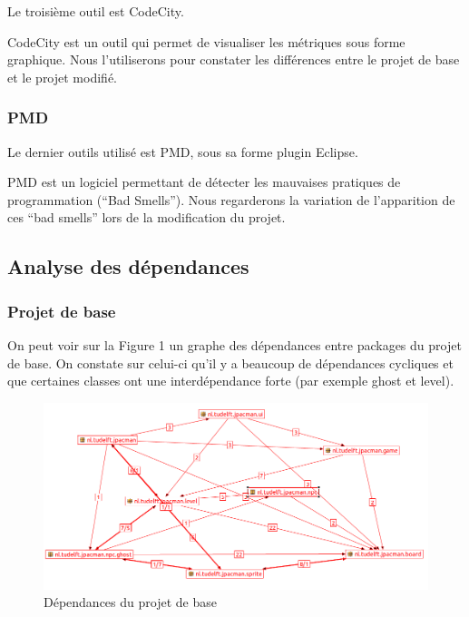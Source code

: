 \documentclass[a4paper,12pt]{report} %
\begin{document}
Le troisième outil est CodeCity.

CodeCity est un outil qui permet de visualiser les métriques sous
forme graphique. Nous l'utiliserons pour constater les différences
entre le projet de base et le projet modifié.


\subsubsection{PMD}

Le dernier outils utilisé est PMD, sous sa forme plugin Eclipse.

PMD est un logiciel permettant de détecter les mauvaises pratiques
de programmation (``Bad Smells''). Nous regarderons la variation
de l'apparition de ces ``bad smells'' lors de la modification du
projet.


\subsection{Analyse des dépendances}


\subsubsection{Projet de base}

On peut voir sur la Figure 1 un graphe des dépendances entre packages
du projet de base. On constate sur celui-ci qu'il y a beaucoup de
dépendances cycliques et que certaines classes ont une interdépendance
forte (par exemple ghost et level).

\begin{figure}[!h]
\begin{center}\includegraphics[scale=0.5]{ressources/final_initial_dependencies}\end{center}
\caption{Dépendances du projet de base}
\end{figure}
\end{document}
